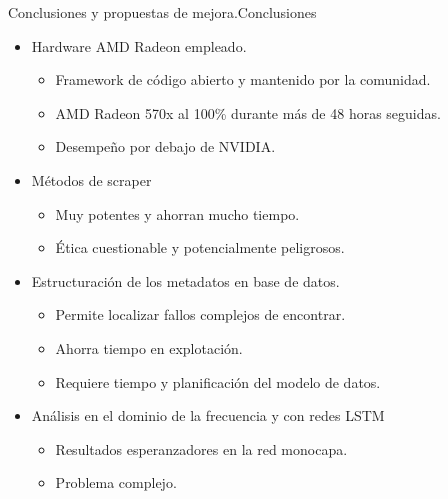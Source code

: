 \begin{frame}{Conclusiones y propuestas de mejora.\newline Conclusiones}
	\begin{itemize}
		\item Hardware AMD Radeon empleado.
		\begin{itemize}
			\scriptsize
			\item {}Framework de código abierto y mantenido por la comunidad.
			\item {}AMD Radeon 570x al 100\% durante más de 48 horas seguidas.
			\item {}Desempeño por debajo de NVIDIA.
		\end{itemize}
		\item Métodos de scraper
		\begin{itemize}
			\scriptsize
			\item {}Muy potentes y ahorran mucho tiempo.
			\item {}Ética cuestionable y potencialmente peligrosos.
		\end{itemize}
		\item Estructuración de los metadatos en base de datos.
		\begin{itemize}
			\scriptsize
			\item {}Permite localizar fallos complejos de encontrar.
			\item {}Ahorra tiempo en explotación.
			\item {}Requiere tiempo y planificación del modelo de datos.
		\end{itemize}
		\item Análisis en el dominio de la frecuencia y con redes LSTM
		\begin{itemize}
			\scriptsize
			\item {}Resultados esperanzadores en la red monocapa.
			\item {}Problema complejo.
		\end{itemize}
	\end{itemize}
\end{frame}
